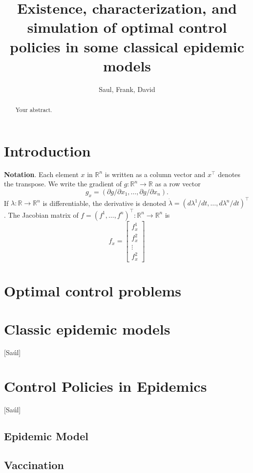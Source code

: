 \documentclass[a4paper]{amsart}
\title{
	Existence, characterization, and simulation
	of optimal control policies in some classical epidemic models
}
\author{Saul, Frank, David}
\newcommand{\R}{\mathbb{R}}
\begin{document}
	\maketitle
\maketitle

\begin{abstract}
	Your abstract.
\end{abstract}

\section{Introduction}

{\bf Notation}. Each element $x$ in $\R^n$ is written as a column vector and $x^\top$ denotes the transpose. We write the gradient of $g:\R^n\to\R$ as a row vector 
    \[ g_x =(\partial g/\partial x_1,\ldots, \partial g/\partial x_n). \]
If $\lambda:\R\to\R^n$ is differentiable, the derivative is denoted $\dot{\lambda}=(d\lambda^1/dt,\ldots,d\lambda^n/dt)^\top$. The Jacobian matrix of $f=(f^1,\ldots,f^n)^\top:\R^n\to\R^n$ is   
\[f_x=\begin{bmatrix}
f^1_x\\
f^2_x\\
\vdots \\
f^2_x
\end{bmatrix}\]

	\section{Optimal control problems}
		
	\section{Classic epidemic models}
	[Saúl]
	\section{Control Policies in Epidemics}
	[Saúl]
    	
      \subsection{Epidemic Model}
        
      \subsection{Vaccination}
	    	
\end{document}
